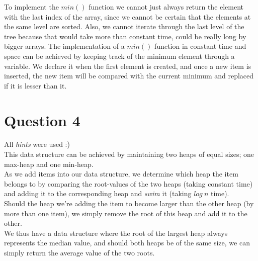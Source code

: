 \documentclass[a4paper]{article}
\begin{document}
\noindent
To implement the $min()$ function we cannot just always return the element with 
the last index of the array, since we cannot be certain that the elements at the 
same level are sorted. Also, we cannot iterate through the last level of the tree 
because that would take more than constant time, could be really long by bigger arrays.  
The implementation of a $min()$ function in constant time and space can be 
achieved by keeping track of the minimum element through a variable. We declare it when 
the first element is created, and once a new item is inserted, the new item will be 
compared with the current minimum and replaced if it is lesser than it.


\section*{Question 4}

\noindent
All \textit{hints} were used :) 
\ \\

\noindent
This data structure can be achieved by maintaining two heaps of equal sizes; one max-heap and one min-heap.\ \\

\noindent
As we add items into our data structure, we determine which heap the item belongs to by comparing the root-values
of the two heaps (taking constant time) and adding it to the corresponding heap and \textit{swim} it (taking $log~n$ time).\ \\

\noindent
Should the heap we're adding the item to become larger than the other heap (by more than one item), we simply remove the root 
of this heap and add it to the other. \ \\

\noindent
We thus have a data structure where the root of the largest heap always represents the median value, and should both heaps 
be of the same size, we can simply return the average value of the two roots. 
\end{document}

